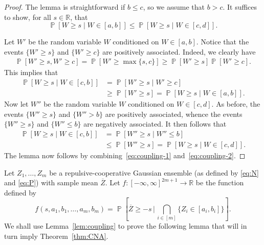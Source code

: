 \documentclass[12pt,english,reqno]{amsart}
\theoremstyle{plain}
\theoremstyle{remark}
\numberwithin{figure}{section}
\numberwithin{equation}{section}
\def\rr{\mathbb{R}}
\def\bZ{\overline{Z}}
\DeclareMathOperator{\Pb}{\mathbb{P}} %
\begin{document}
\begin{proof}
	The lemma is straightforward if $b\leq c$, so we assume that $b>c$. It suffices to show, for all $s \in \rr$, that
	\[
		\Pb\left[ W \geq s \mid W \in [a,b] \right] \leq \Pb\left[ W \geq s \mid W \in [c,d] \right].
	\]

	Let $W'$ be the random variable $W$ conditioned on $W \in [a,b]$. Notice that the events $\{W' \geq s \}$ and $\{W' \geq c \}$ are positively associated. Indeed, we clearly have
	\begin{align}\label{eq:coupling-1.5}
		\Pb\left[ W' \geq s, W' \geq c \right] = \Pb\left[ W' \geq \max \{s,c\} \right] \geq \Pb\left[ W' \geq s \right] \Pb\left[ W' \geq c \right].
	\end{align}
	This implies that
	\begin{equation}\label{eq:coupling-1}
		\begin{split}
			\Pb\left[ W \geq s \mid W \in [c,b] \right] & = \Pb\left[ W' \geq s \mid W' \geq c\right]                                      \\
			                                            & \geq \Pb\left [ W' \geq s \right] = \Pb\left[ W \geq s \mid W \in [a,b] \right].
		\end{split}
	\end{equation}
	Now let $W''$ be the random variable $W$ conditioned on $W \in [c,d]$. As before, the events $\{W'' \geq s \}$ and $\{W''> b \}$ are positively associated, whence the events $\{W'' \geq s \}$ and $\{W'' \leq b \}$ are negatively associated. It then follows that
	\begin{equation}\label{eq:coupling-2}
		\begin{split}
			\Pb\left[ W \geq s \mid W \in [c,b] \right] & = \Pb\left[ W'' \geq s \mid W'' \leq b \right]                                   \\
			                                            & \leq \Pb\left[ W'' \geq s \right] = \Pb\left[ W \geq s \mid W \in [c,d] \right].
		\end{split}
	\end{equation}
	The lemma now follows by combining~\eqref{eq:coupling-1} and~\eqref{eq:coupling-2}.
\end{proof}

Let 
 $Z_1,\dots, Z_m$  be a repulsive-cooperative Gaussian ensemble (as defined by \ref{eq:N} and \ref{eq:P})  with sample mean $\bZ$.
 Let $f:[-\infty,\infty]^{2m+1} \to \rr$ be the function defined by
\begin{equation}\label{eq:deff}
	f(s, a_1,b_1,\dots, a_m,b_m) = \Pb\left[ \bZ \geq -s \, \Big \vert \, \bigcap_{i \in [m]} \{Z_i \in [a_i,b_i]\} \right].
\end{equation}
We shall use Lemma~\ref{lem:coupling} to prove the following lemma that will in turn imply Theorem~\ref{thm:CNA}.
\end{document}
